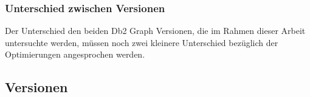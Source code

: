 \subsubsection{Unterschied zwischen Versionen}
Der Unterschied den beiden Db2 Graph Versionen, die im Rahmen dieser Arbeit untersuchte werden, müssen noch zwei kleinere Unterschied bezüglich der Optimierungen angesprochen werden.  

\subsection{Versionen}
